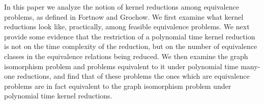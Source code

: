 In this paper we analyze the notion of kernel reductions among equivalence
problems, as defined in Fortnow and Grochow. We first examine what kernel
reductions look like, practically, among feasible equivalence problems. We next
provide some evidence that the restriction of a polynomial time kernel
reduction is not on the time complexity of the reduction, but on the number of
equivalence classes in the equivalence relations being reduced. We then examine
the graph isomorphism problem and problems equivalent to it under polynomial
time many-one reductions, and find that of these problems the ones which are
equivalence problems are in fact equivalent to the graph isomorphism problem
under polynomial time kernel reductions.
